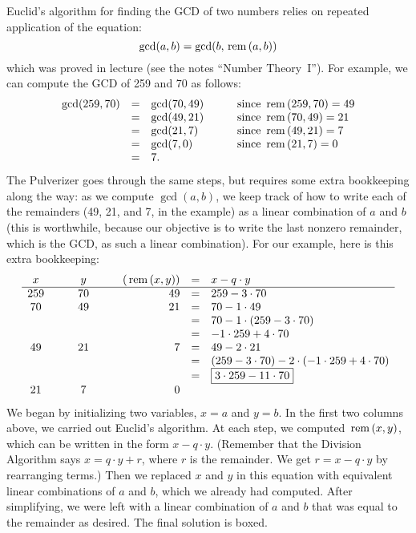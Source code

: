 \documentclass[12pt]{article}
\begin{document}
{\noindent
Euclid's algorithm for finding the GCD of two numbers relies on
repeated application of the equation: 
\[
\gcd(a, b) = \gcd(b, \operatorname{\,rem\,}(a,b))
\]
which was proved in lecture (see the notes ``Number Theory~I'').  For 
example, we can compute the GCD of 259 and 70 as follows:
\[
\begin{array}{rclcl}
\gcd(259, 70)
    & = & \gcd(70, 49) & \quad & \text{since $\operatorname{\,rem\,}(259,70) = 49$}\\
    & = & \gcd(49, 21) && \text{since $\operatorname{\,rem\,}(70,49) = 21$} \\
    & = & \gcd(21, 7) && \text{since $\operatorname{\,rem\,}(49,21) = 7$} \\
    & = & \gcd(7, 0) && \text{since $\operatorname{\,rem\,}(21,7) = 0$} \\
    & = & 7.
\end{array}
\]
The Pulverizer goes through the same steps, but requires some extra
bookkeeping along the way: as we compute $\gcd(a, b)$, we keep track
of how to write each of the remainders (49, 21, and 7, in the example)
as a linear combination of $a$ and $b$ (this is worthwhile, because
our objective is to write the last nonzero remainder, which is the
GCD, as such a linear combination).  For our example, here is this
extra bookkeeping:
\[
\begin{array}{ccccrcl}
x & \quad & y & \quad & (\operatorname{\,rem\,}(x,y)) & = & x - q \cdot y \\ \hline
259 && 70 && 49 & = &   259 - 3 \cdot 70 \\
70 && 49 && 21  & = &   70 - 1 \cdot 49 \\
&&&&            & = &   70 - 1 \cdot (259 - 3 \cdot 70) \\
&&&&            & = &   -1 \cdot 259 + 4 \cdot 70 \\
49 && 21 && 7   & = &   49 - 2 \cdot 21 \\
&&&&            & = &   (259 - 3 \cdot 70) -
                                2 \cdot (-1 \cdot 259 + 4 \cdot 70) \\
&&&&            & = &   \fbox{$3 \cdot 259 - 11 \cdot 70$} \\
21 && 7 && 0
\end{array}
\]
We began by initializing two variables, $x = a$ and $y = b$.  In the
first two columns above, we carried out Euclid's algorithm.  At each
step, we computed $\operatorname{\,rem\,}(x,y)$, which can be written in the form $x - q
\cdot y$.  (Remember that the Division Algorithm says $x = q \cdot y +
r$, where $r$ is the remainder.  We get $r = x - q \cdot y$ by
rearranging terms.)  Then we replaced $x$ and $y$ in this equation
with equivalent linear combinations of $a$ and $b$, which we already
had computed.  After simplifying, we were left with a linear
combination of $a$ and $b$ that was equal to the remainder as desired.
The final solution is boxed.

\newpage
} %
\end{document}
